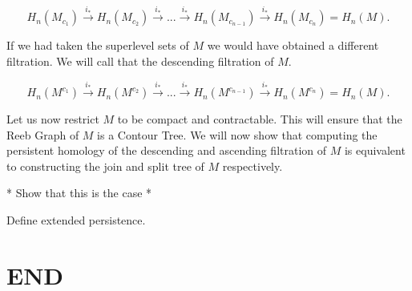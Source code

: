 $$ H_n(M_{c_1}) \overset{i_*}{\longrightarrow} H_n(M_{c_2}) \overset{i_*}{\longrightarrow} ... \overset{i_*}{\longrightarrow} H_n(M_{c_{n-1}}) \overset{i_*}{\longrightarrow} H_n(M_{c_n}) = H_n(M).$$

If we had taken the superlevel sets of $M$ we would have obtained a different filtration. We will call that the descending filtration of $M$.

$$ H_n(M^{c_1}) \overset{i_*}{\longrightarrow} H_n(M^{c_2}) \overset{i_*}{\longrightarrow} ... \overset{i_*}{\longrightarrow} H_n(M^{c_{n-1}}) \overset{i_*}{\longrightarrow} H_n(M^{c_n}) = H_n(M).$$


Let us now restrict $M$ to be compact and contractable. This will ensure that the Reeb Graph of $M$ is a Contour Tree. We will now show that computing the persistent homology of the descending and ascending filtration of $M$ is equivalent to constructing the join and split tree of $M$ respectively.

* Show that this is the case *

Define extended persistence.

\section{END}





